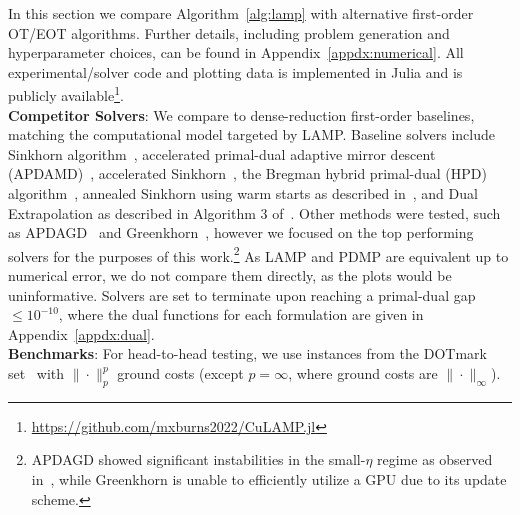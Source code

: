 \documentclass[10pt]{article}
\theoremstyle{plain}
\theoremstyle{definition}
\theoremstyle{remark}
\begin{document}
In this section we compare Algorithm~\ref{alg:lamp} with alternative first-order OT/EOT algorithms. Further details, including problem generation and hyperparameter choices, can be found in Appendix~\ref{appdx:numerical}. All experimental/solver code and plotting data is implemented in Julia and is publicly available\footnote{\href{https://github.com/mxburns2022/CuLAMP.jl}{https://github.com/mxburns2022/CuLAMP.jl}

}.\\

\noindent\textbf{Competitor Solvers}: We compare to dense-reduction first-order baselines, matching the computational model targeted by LAMP. Baseline solvers include Sinkhorn algorithm~\cite{altschulerNearlinearTimeApproximation2017}, accelerated primal-dual adaptive mirror descent (APDAMD)~\cite{linEfficiencyEntropicRegularized2022}, accelerated Sinkhorn~\cite{linEfficiencyEntropicRegularized2022}, the Bregman hybrid primal-dual (HPD) algorithm~\cite{chambolleAcceleratedBregmanPrimalDual2022}, annealed Sinkhorn using warm starts as described in~\cite{kemertasEfficientAccurateOptimal2025}, and Dual Extrapolation as described in Algorithm 3 of~\cite{jambulapatiDirectTildelbraceOrbrace2019a}. Other methods were tested, such as APDAGD~\cite{dvurechenskyComputationalOptimalTransport2018} and Greenkhorn~\cite{altschulerNearlinearTimeApproximation2017}, however we focused on the top performing solvers for the purposes of this work.\footnote{APDAGD showed significant instabilities in the small-$\eta$ regime as observed in~\cite{linEfficiencyEntropicRegularized2022}, while Greenkhorn is unable to efficiently utilize a GPU due to its update scheme.} As LAMP and PDMP are equivalent up to numerical error, we do not compare them directly, as the plots would be uninformative. Solvers are set to terminate upon reaching a primal-dual gap $\leq 10^{-10}$, where the dual functions for each formulation are given in Appendix~\ref{appdx:dual}. \\
\noindent\textbf{Benchmarks}:  For head-to-head testing, we use instances from the DOTmark set~\cite{schrieberDOTmarkBenchmarkDiscrete2017} with $\|\cdot\|_p^p$ ground costs (except $p=\infty$, where ground costs are $\|\cdot\|_\infty$). 
\end{document}
